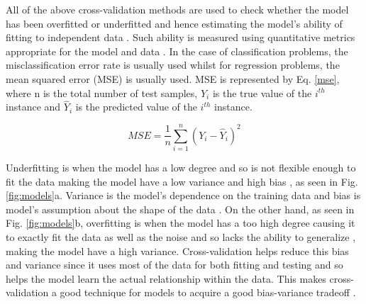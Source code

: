 All of the above cross-validation methods are used to check whether the model has been overfitted or underfitted and hence estimating the model's ability of fitting to independent data . Such ability is measured using quantitative metrics appropriate for the model and data \cite[-3\baselineskip]{kohavi1995study, arlot2010survey}. In the case of classification problems, the misclassification error rate is usually used whilst for regression problems, the mean squared error (MSE) is usually used. MSE is represented by Eq. \ref{mse}, where n is the total number of test samples, \(Y_i\) is the true value of the \(i^{th}\) instance and \(\hat{Y}_i\) is the predicted value of the \(i^{th}\) instance.

\begin{equation}\label{mse}
MSE = \frac{1}{n}\sum^{n}_{i=1}(Y_i - \hat{Y}_i)^2
\end{equation}

Underfitting is when the model has a low degree and so is not flexible enough to fit the data making the model have a low variance and high bias \cite{baumann2003cross}, as seen in Fig. \ref{fig:models}a. Variance is the model's dependence on the training data and bias is model's assumption about the shape of the data \cite{arlot2010survey}. On the other hand, as seen in Fig. \ref{fig:models}b, overfitting is when the model has a too high degree causing it to exactly fit the data as well as the noise and so lacks the ability to generalize \cite{baumann2003cross}, making the model have a high variance. Cross-validation helps reduce this bias and variance since it uses most of the data for both fitting and testing and so helps the model learn the actual relationship within the data. This makes cross-validation a good technique for models to acquire a good bias-variance tradeoff \cite{arlot2010survey}.

